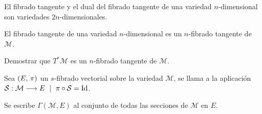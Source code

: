 \begin{exercise}
  El fibrado tangente y el dual del fibrado tangente de una variedad $n$-dimensional son variedades
  $2n$-dimensionales.
\end{exercise}

\begin{proposition}
El fibrado tangente de una variedad $n$-dimensional es un $n$-fibrado tangente de $\mathcal{M}$.
\end{proposition}

\begin{exercise}
  Demostrar que $T^*\mathcal{M}$ es un $n$-fibrado tangente de $\mathcal{M}$.
\end{exercise}

\begin{definition}
  Sea $(E,\thinspace\pi)$ un $s$-fibrado vectorial sobre la variedad $\mathcal{M}$, se llama  a la
  aplicación $\maps{\mathcal{S}}{\mathcal{M}}{E}\ \mid\ \pi\circ\mathcal{S}=\operatorname{Id}$.
\end{definition}
\begin{notation}
  Se escribe $\Gamma(\mathcal{M},E)$ al conjunto de todas las secciones de $\mathcal{M}$ en $E$.
\end{notation}
